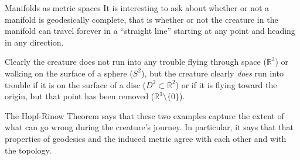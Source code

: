\documentclass{article}
\theoremstyle{definition}
\theoremstyle{remark}
\begin{document}
\begin{section}{Manifolds as metric spaces}
  It is interesting to ask about whether or not a manifold is geodesically
  complete, that is whether or not the creature in the manifold can travel
  forever in a ``straight line'' starting at any point and heading in any
  direction.

  Clearly the creature does not run into any trouble flying through space
  ($\mathbb R^3$) or walking on the surface of a sphere ($S^2$), but the creature
  clearly \textit{does} run into trouble if it is on the surface of a disc
  ($D^2 \subset \mathbb R^2$) or if it is flying toward the origin,
  but that point has been removed ($\mathbb R^3 \setminus \{ 0 \}$).

    The Hopf-Rinow Theorem says that these two examples capture the extent of what
  can go wrong during the creature's journey. In particular, it says that that
  properties of geodesics and the induced metric agree with each other and with
  the topology.


\end{section}
\end{document}
